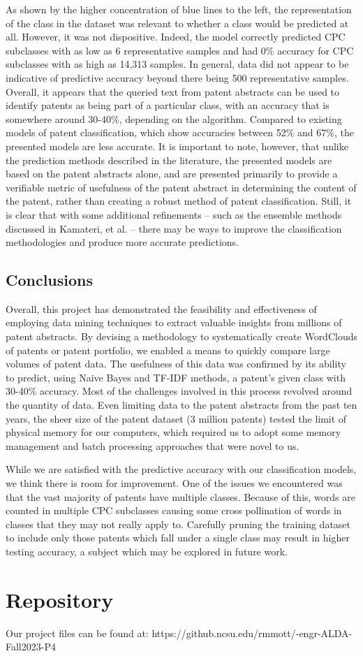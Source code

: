 \documentclass{article}
\begin{document}
As shown by the higher concentration of blue lines to the left, the representation of the class in the dataset was relevant to whether a class would be predicted at all.  However, it was not dispositive.  Indeed, the model correctly predicted CPC subclasses with as low as 6 representative samples and had 0\% accuracy for CPC subclasses with as high as 14,313 samples.  In general, data did not appear to be indicative of predictive accuracy beyond there being 500 representative samples. Overall, it appears that the queried text from patent abstracts can be used to identify patents as being part of a particular class, with an accuracy that is somewhere around 30-40\%, depending on the algorithm.  Compared to existing models of patent classification, which show accuracies between 52\% and 67\%\cite{article:kamateri}, the presented models are less accurate.  It is important to note, however, that unlike the prediction methods described in the literature, the presented models are based on the patent abstracts alone, and are presented primarily to provide a verifiable metric of usefulness of the patent abstract in determining the content of the patent, rather than creating a robust method of patent classification.  Still, it is clear that with some additional refinements – such as the ensemble methods discussed in Kamateri, et al. – there may be ways to improve the classification methodologies and produce more accurate predictions.

\subsection{Conclusions}
Overall, this project has demonstrated the feasibility and effectiveness of employing data mining techniques to extract valuable insights from millions of patent abstracts.  By devising a methodology to systematically create WordClouds of patents or patent portfolio, we enabled a means to quickly compare large volumes of patent data.  The usefulness of this data was confirmed by its ability to predict, using Naive Bayes and TF-IDF methods, a patent’s given class with 30-40\% accuracy. Most of the challenges involved in this process revolved around the quantity of data.  Even limiting data to the patent abstracts from the past ten years, the sheer size of the patent dataset (3 million patents) tested the limit of physical memory for our computers, which required us to adopt some memory management and batch processing approaches that were novel to us.  

While we are satisfied with the predictive accuracy with our classification models, we think there is room for improvement. One of the issues we encountered was that the vast majority of patents have multiple classes. Because of this, words are counted in multiple CPC subclasses causing some cross pollination of words in classes that they may not really apply to. Carefully pruning the training dataset to include only those patents which fall under a single class may result in higher testing accuracy, a subject which may be explored in future work.

\section{Repository}
Our project files can be found at: https://github.ncsu.edu/rmmott/-engr-ALDA-Fall2023-P4

 



\end{document}

